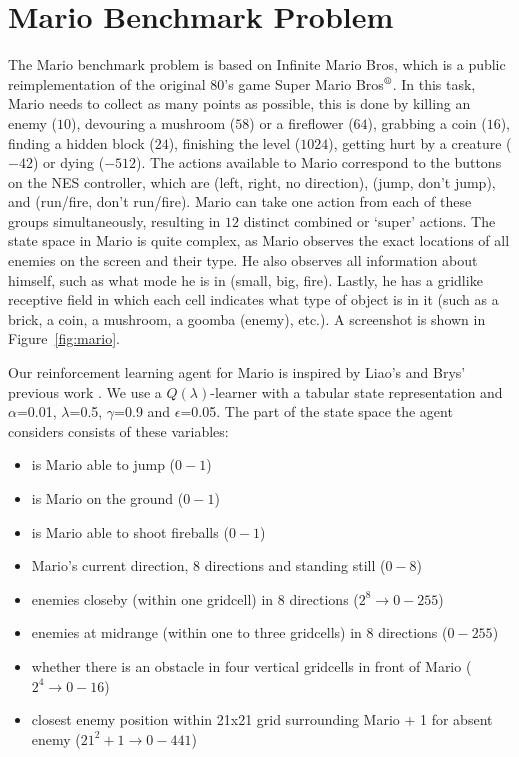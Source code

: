 \documentclass[twoside,11pt]{article}
\begin{document}
\section{Mario Benchmark Problem}

The Mario benchmark problem \citep{karakovskiy2012mario} is based on Infinite Mario Bros, which is a public reimplementation of the original $80$'s game Super Mario Bros$^\text{\textregistered}$. In this task, Mario needs to collect as many points as possible, this is done by killing an enemy ($10$), devouring a mushroom ($58$) or a fireflower ($64$), grabbing a coin ($16$), finding a hidden block ($24$), finishing the level ($1024$), getting hurt by a creature ($-42$) or dying ($-512$). The actions available to Mario correspond to the buttons on the NES controller, which are (left, right, no direction), (jump, don't jump), and (run/fire, don't run/fire). Mario can take one action from each of these groups simultaneously, resulting in $12$ distinct combined or `super' actions. The state space in Mario is quite complex, as Mario observes the exact locations of all enemies on the screen and their type. He also observes all information about himself, such as what mode he is in (small, big, fire). Lastly, he has a gridlike receptive field in which each cell indicates what type of object is in it (such as a brick, a coin, a mushroom, a goomba (enemy), etc.). A screenshot is shown in Figure~\ref{fig:mario}.
 
Our reinforcement learning agent for Mario is inspired by Liao's and Brys' previous work \citep{brys2014multi,liao2012cs229}. We use a $Q(\lambda)$-learner with a tabular state representation and $\alpha$=0.01, $\lambda$=0.5, $\gamma$=0.9 and $\epsilon$=0.05. The part of the state space the agent considers consists of these variables:

\begin{itemize}
\item is Mario able to jump ($0-1$)
\item is Mario on the ground ($0-1$)
\item is Mario able to shoot fireballs ($0-1$)
\item Mario's current direction, 8 directions and standing still ($0-8$)
\item enemies closeby (within one gridcell) in 8 directions ($2^8 \rightarrow 0-255$)
\item enemies at midrange (within one to three gridcells) in 8 directions ($0-255$)
\item whether there is an obstacle in four vertical gridcells in front of Mario ($2^4 \rightarrow 0-16$)
\item closest enemy position within 21x21 grid surrounding Mario + 1 for absent enemy ($21^2+1 \rightarrow 0-441$)
\end{itemize}
\end{document}
